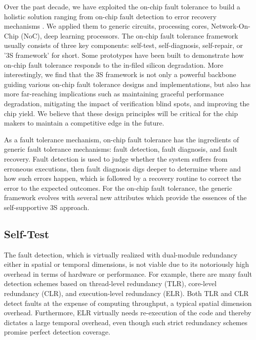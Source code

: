 Over the past decade, we have exploited the on-chip fault tolerance to build a holistic solution ranging from on-chip fault detection to error recovery mechanisms \cite{ReviveNet, fu2011abacus,  yan2015corerank, yan2010svfd, zhang2009topology, han2013revivepath, liu2021hyca}. We applied them to generic circuits, processing cores, Network-On-Chip
(NoC), deep learning processors. The on-chip fault tolerance framework usually consists of three key components: self-test, self-diagnosis, self-repair, or '3S framework' for short. Some prototypes have been built to demonstrate how on-chip fault tolerance responds to the in-filed silicon degradation. More interestingly, we find that the 3S framework is not only a powerful backbone guiding various on-chip fault tolerance designs and implementations, but also has more far-reaching implications such as maintaining graceful performance degradation, mitigating the impact of verification blind spots, and improving the chip yield. We believe that these design principles will be critical for the chip makers to maintain a competitive edge in the future.

As a fault tolerance mechanism, on-chip fault tolerance has the ingredients of generic fault tolerance mechanisms: fault detection, fault diagnosis, and fault recovery. Fault detection is used to judge whether the system suffers from erroneous executions, then fault diagnosis digs deeper to determine where and how such errors happen, which is followed by a recovery routine to correct the error to the expected outcomes. For the on-chip fault tolerance, the generic framework evolves with several new attributes which provide the essences of the self-supportive 3S approach.

\subsection{Self-Test}
The fault detection, which is virtually realized with dual-module redundancy either in spatial or temporal dimensions, is not viable due to its notoriously high overhead in terms of hardware or performance. For example, there are many fault detection schemes based on thread-level redundancy (TLR), core-level redundancy (CLR), and execution-level redundancy (ELR). Both TLR and CLR detect faults at the expense of computing throughput, a typical spatial dimension overhead. Furthermore, ELR virtually needs re-execution of the code and thereby dictates a large temporal overhead, even though such strict redundancy schemes promise perfect detection coverage.

